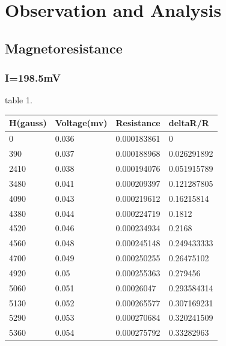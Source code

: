 \section{\label{sec:level1}Observation and Analysis}
\subsection{Magnetoresistance}
\subsubsection{I=198.5mV}
table 1.
\begin{table}[!ht]
    \centering
    \begin{tabular}{|l|l|l|l|}
    \hline
        H(gauss) & Voltage(mv) & Resistance & deltaR/R \\ \hline
        0 & 0.036 & 0.000183861 & 0 \\ \hline
        390 & 0.037 & 0.000188968 & 0.026291892 \\ \hline
        2410 & 0.038 & 0.000194076 & 0.051915789 \\ \hline
        3480 & 0.041 & 0.000209397 & 0.121287805 \\ \hline
        4090 & 0.043 & 0.000219612 & 0.16215814 \\ \hline
        4380 & 0.044 & 0.000224719 & 0.1812 \\ \hline
        4520 & 0.046 & 0.000234934 & 0.2168 \\ \hline
        4560 & 0.048 & 0.000245148 & 0.249433333 \\ \hline
        4700 & 0.049 & 0.000250255 & 0.26475102 \\ \hline
        4920 & 0.05 & 0.000255363 & 0.279456 \\ \hline
        5060 & 0.051 & 0.00026047 & 0.293584314 \\ \hline
        5130 & 0.052 & 0.000265577 & 0.307169231 \\ \hline
        5290 & 0.053 & 0.000270684 & 0.320241509 \\ \hline
        5360 & 0.054 & 0.000275792 & 0.33282963 \\ \hline
    \end{tabular}
\end{table}

